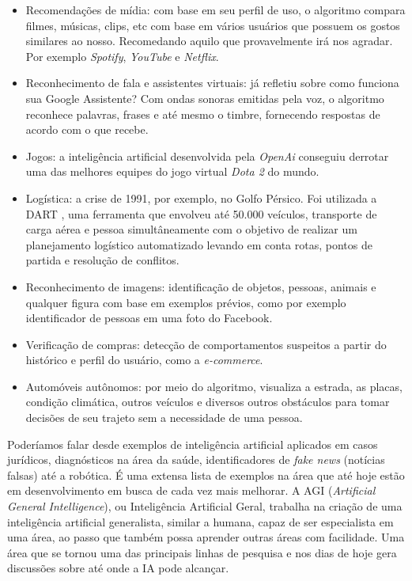 \documentclass[
  openany]{book}
\begin{document}
\begin{itemize}
\item
  Recomendações de mídia: com base em seu perfil de uso, o algoritmo compara filmes, músicas, clips, etc com base em vários usuários que possuem os gostos similares ao nosso. Recomedando aquilo que provavelmente irá nos agradar. Por exemplo \emph{Spotify}, \emph{YouTube} e \emph{Netflix}.
\item
  Reconhecimento de fala e assistentes virtuais: já refletiu sobre como funciona sua Google Assistente? Com ondas sonoras emitidas pela voz, o algoritmo reconhece palavras, frases e até mesmo o timbre, fornecendo respostas de acordo com o que recebe.
\item
  Jogos: a inteligência artificial desenvolvida pela \emph{OpenAi} conseguiu derrotar uma das melhores equipes do jogo virtual \emph{Dota 2} do mundo.
\item
  Logística: a crise de 1991, por exemplo, no Golfo Pérsico. Foi utilizada a DART \citep{cross1994dart}, uma ferramenta que envolveu até 50.000 veículos, transporte de carga aérea e pessoa simultâneamente com o objetivo de realizar um planejamento logístico automatizado levando em conta rotas, pontos de partida e resolução de conflitos.
\item
  Reconhecimento de imagens: identificação de objetos, pessoas, animais e qualquer figura com base em exemplos prévios, como por exemplo identificador de pessoas em uma foto do Facebook.
\item
  Verificação de compras: detecção de comportamentos suspeitos a partir do histórico e perfil do usuário, como a \emph{e-commerce}.
\item
  Automóveis autônomos: por meio do algoritmo, visualiza a estrada, as placas, condição climática, outros veículos e diversos outros obstáculos para tomar decisões de seu trajeto sem a necessidade de uma pessoa.
\end{itemize}

Poderíamos falar desde exemplos de inteligência artificial aplicados em casos jurídicos, diagnósticos na área da saúde, identificadores de \emph{fake news} (notícias falsas) até a robótica. É uma extensa lista de exemplos na área que até hoje estão em desenvolvimento em busca de cada vez mais melhorar. A AGI (\emph{Artificial General Intelligence}), ou Inteligência Artificial Geral, trabalha na criação de uma inteligência artificial generalista, similar a humana, capaz de ser especialista em uma área, ao passo que também possa aprender outras áreas com facilidade. Uma área que se tornou uma das principais linhas de pesquisa e nos dias de hoje gera discussões sobre até onde a IA pode alcançar.
\end{document}
